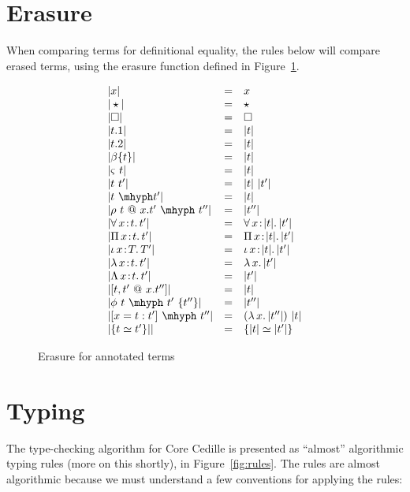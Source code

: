 \documentclass{article}
\newcommand{\abs}[4]{{#1}\, #2\! : \! #3.\, #4}
\newcommand{\absu}[3]{{#1}\, #2.\, #3}
\begin{document}
\section{Erasure}

When comparing terms for definitional equality, the rules below will
compare erased terms, using the erasure function defined in
Figure~\ref{fig:eraser}.

\begin{figure}
  \[
  \begin{array}{lll}
    |x| & = & x \\
    |\star| & = & \star \\
    |\Box| & = & \Box \\
    |t.1| & = & |t| \\
    |t.2| & = & |t| \\
    |\beta\{t\}| & = & |t|\\
    |\varsigma\ t| & = & |t| \\
    |t\ t'| & = & |t|\ |t'| \\
    |t\ \mhyph t'| & = & |t| \\
    |\rho\ t\ @\ x.t'\ \mhyph\ t''| & = & |t''| \\
    |\abs{\forall}{x}{t}{t'}| & = & \abs{\forall}{x}{|t|}{|t'|}\\
    |\abs{\Pi}{x}{t}{t'}| & = & \abs{\Pi}{x}{|t|}{|t'|}\\
    |\abs{\iota}{x}{T}{T'}| & = & \abs{\iota}{x}{|t|}{|t'|} \\
    |\abs{\lambda}{x}{t}{t'}| & = &  \absu{\lambda}{x}{|t'|} \\
    |\abs{\Lambda}{x}{t}{t'}| & = &  |t'| \\ 
    |[ t , t' \ @\ x.t'' ]| & = & |t| \\ 
    |\phi\ t\ \mhyph\ t'\ \{t''\}| & = & |t''| \\
    |[ x = t : t' ]\ \mhyph\ t'' | & = & (\absu{\lambda}{x}{|t''|})\ |t|\\
    |\{ t \simeq t' \}|| & = & \{ |t| \simeq |t'| \}
  \end{array}
  \]
  \caption{Erasure for annotated terms}
  \label{fig:eraser}
\end{figure}  


\section{Typing}

The type-checking algorithm for Core Cedille is presented as ``almost'' algorithmic typing rules (more on this shortly),
in Figure~\ref{fig:rules}.  The rules are almost algorithmic because we must understand a few conventions for applying the rules:
\end{document}
